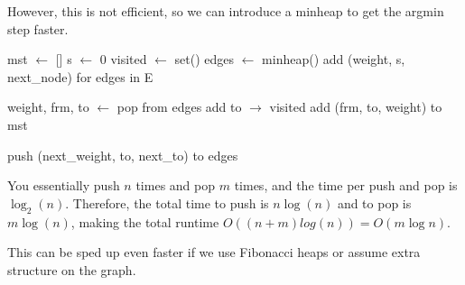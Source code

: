 \documentclass{article}
\begin{document}
      However, this is not efficient, so we can introduce a minheap to get the argmin step faster. 

      \begin{algo}
        \begin{algorithm}[H]
          \label{alg:prims}
          \begin{algorithmic}[1]
              \State mst $\gets$ [] 
              \State s $\gets$ 0 
              \State visited $\gets$ set() 
              \State edges $\gets$ minheap() 
              \State add (weight, s, next\_node) for edges in E 

               
                \State weight, frm, to $\gets$ pop from edges 
                 
                  \State add to $\rightarrow$ visited 
                  \State add (frm, to, weight) to mst 

                   
                     
                      \State push (next\_weight, to, next\_to) to edges
                    \EndIf
                  \EndFor
                \EndIf
              \EndWhile 

              \State {} 
            \EndFunction
          \end{algorithmic}
        \end{algorithm}

        You essentially push $n$ times and pop $m$ times, and the time per push and pop is $\log_2 (n)$. Therefore, the total time to push is $n \log(n)$ and to pop is $m \log (n)$, making the total runtime $O((n + m) log(n)) = O(m \log{n})$. 
      \end{algo}

      This can be sped up even faster if we use Fibonacci heaps or assume extra structure on the graph. 
\end{document}
